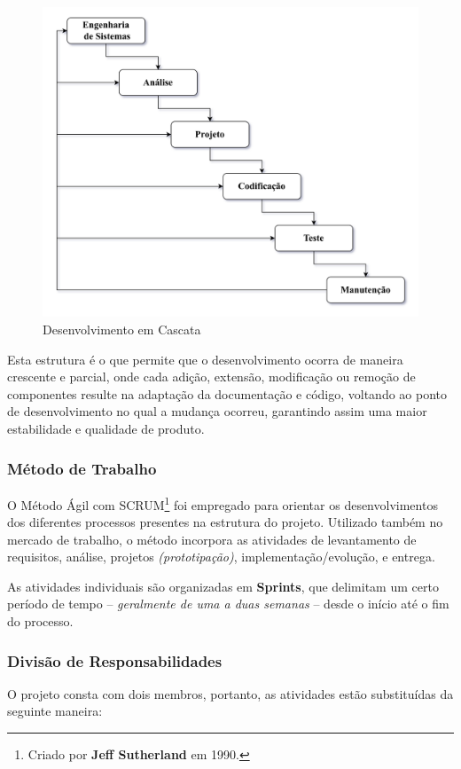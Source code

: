\documentclass[a4paper,12pt]{article}
\begin{document}
\vspace{1em}
\begin{figure}[H]
    \centering
    \includegraphics[scale=0.25]{waterfall.drawio.png}
    \caption{Desenvolvimento em Cascata}
\end{figure}

Esta estrutura é o que permite que o desenvolvimento ocorra de maneira crescente e parcial, onde cada adição, extensão,
 modificação ou remoção de componentes resulte na adaptação da documentação e código, voltando ao ponto de desenvolvimento 
 no qual a mudança ocorreu, garantindo assim uma maior estabilidade e qualidade de produto.

\subsubsection{Método de Trabalho}
O Método Ágil com SCRUM\footnote{
    Criado por \textbf{Jeff Sutherland} em 1990.
} foi empregado para orientar os desenvolvimentos dos diferentes processos presentes na estrutura do projeto. Utilizado também no mercado 
de trabalho, o método incorpora as atividades de levantamento de requisitos, análise, projetos \textit{(prototipação)}, 
implementação/evolução, e entrega.

As atividades individuais são organizadas em \textbf{Sprints}, que delimitam um certo período de 
tempo -- \textit{geralmente de uma a duas semanas} -- desde o início até o fim do processo.

\subsubsection{Divisão de Responsabilidades}
O projeto consta com dois membros, portanto, as atividades estão substituídas da seguinte maneira:
\end{document}
